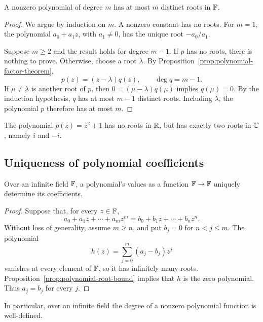 \begin{proposition}\label{prop:polynomial-root-bound}
  A nonzero polynomial of degree $m$ has at most $m$ distinct roots
  in $\mathbb{F}$.
\end{proposition}

\begin{proof}
  We argue by induction on $m$. A nonzero constant has no roots.
  For $m=1$, the polynomial $a_0+a_1z$, with $a_1\neq0$, has the
  unique root $-a_0/a_1$.

  Suppose $m\geq2$ and the result holds for degree $m-1$. If $p$
  has no roots, there is nothing to prove. Otherwise, choose a root
  $\lambda$. By Proposition~\ref{prop:polynomial-factor-theorem},
  \[
    p(z)=(z-\lambda)q(z),\qquad \deg q=m-1.
  \]
  If $\mu\neq\lambda$ is another root of $p$, then
  $0=(\mu-\lambda)q(\mu)$ implies $q(\mu)=0$. By the induction
  hypothesis, $q$ has at most $m-1$ distinct roots. Including
  $\lambda$, the polynomial $p$ therefore has at most $m$.
\end{proof}

\begin{example}
  The polynomial $p(z)=z^2+1$ has no roots in $\mathbb{R}$, but has
  exactly two roots in $\mathbb{C}$, namely $i$ and $-i$.
\end{example}

\subsection{Uniqueness of polynomial coefficients}

\begin{corollary}\label{cor:polynomial-coefficients-unique}
  Over an infinite field $\mathbb{F}$, a polynomial's values as a
  function $\mathbb{F}\to\mathbb{F}$ uniquely determine its coefficients.
\end{corollary}

\begin{proof}
  Suppose that, for every $z\in\mathbb{F}$,
  \[
    a_0+a_1z+\cdots+a_mz^m=b_0+b_1z+\cdots+b_nz^n.
  \]
  Without loss of generality, assume $m\geq n$, and put $b_j=0$
  for $n<j\leq m$. The polynomial
  \[
    h(z)=\sum_{j=0}^m(a_j-b_j)z^j
  \]
  vanishes at every element of $\mathbb{F}$, so it has infinitely many
  roots. Proposition~\ref{prop:polynomial-root-bound} implies that
  $h$ is the zero polynomial. Thus $a_j=b_j$ for every $j$.
\end{proof}

In particular, over an infinite field the degree of a nonzero
polynomial function is well-defined.

